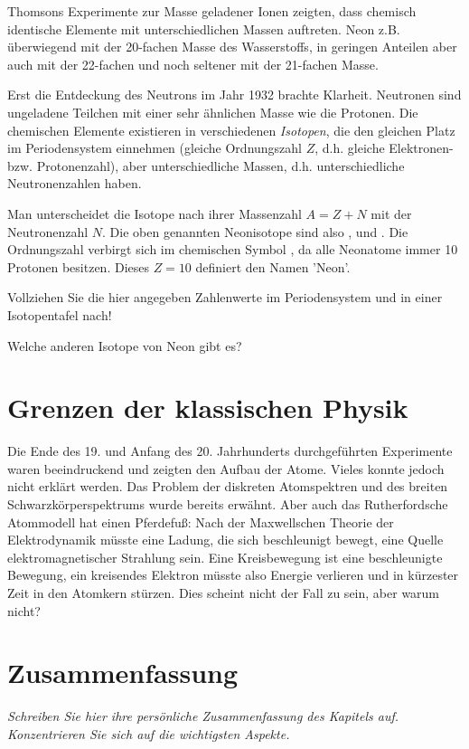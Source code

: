 Thomsons Experimente zur Masse geladener Ionen zeigten, dass chemisch identische Elemente mit unterschiedlichen Massen auftreten. Neon z.B. überwiegend mit der 20-fachen Masse des Wasserstoffs, in geringen Anteilen aber auch mit der 22-fachen und noch seltener mit der 21-fachen Masse.

Erst die Entdeckung des Neutrons im Jahr 1932 brachte Klarheit. Neutronen sind ungeladene Teilchen mit einer sehr ähnlichen Masse wie die Protonen. Die chemischen Elemente existieren in verschiedenen \emph{Isotopen}, die den gleichen Platz im Periodensystem einnehmen (gleiche Ordnungszahl $Z$, d.h. gleiche Elektronen- bzw. Protonenzahl), aber unterschiedliche Massen, d.h. unterschiedliche Neutronenzahlen haben.

Man unterscheidet die Isotope nach ihrer Massenzahl $A = Z + N$ mit der Neutronenzahl $N$. Die oben genannten Neonisotope sind also ,  und . Die Ordnungszahl verbirgt sich im chemischen Symbol , da alle Neonatome immer 10 Protonen besitzen. Dieses $Z=10$ definiert den Namen 'Neon'.


\begin{questions}  
    \item Vollziehen Sie die hier angegeben Zahlenwerte im Periodensystem und in einer Isotopentafel nach! 
    \item Welche anderen Isotope von Neon gibt es?
\end{questions}

  

\section{Grenzen der klassischen Physik}

Die Ende des 19. und Anfang des 20. Jahrhunderts durchgeführten Experimente waren beeindruckend und zeigten den Aufbau der Atome. Vieles konnte jedoch nicht erklärt werden. Das Problem der diskreten Atomspektren und des breiten Schwarzkörperspektrums wurde bereits erwähnt. Aber auch das Rutherfordsche Atommodell hat einen Pferdefuß: Nach der Maxwellschen Theorie der Elektrodynamik müsste eine Ladung, die sich beschleunigt bewegt, eine Quelle elektromagnetischer Strahlung sein. Eine Kreisbewegung ist eine beschleunigte Bewegung, ein kreisendes Elektron müsste also Energie verlieren und in kürzester Zeit in den Atomkern stürzen. Dies scheint nicht der Fall zu sein, aber warum nicht?

\section{Zusammenfassung}

\textit{Schreiben Sie hier ihre persönliche Zusammenfassung des Kapitels auf. Konzentrieren Sie sich auf die wichtigsten Aspekte.}

\vspace*{10cm}




\printbibliography[segment=\therefsegment,heading=subbibliography]
